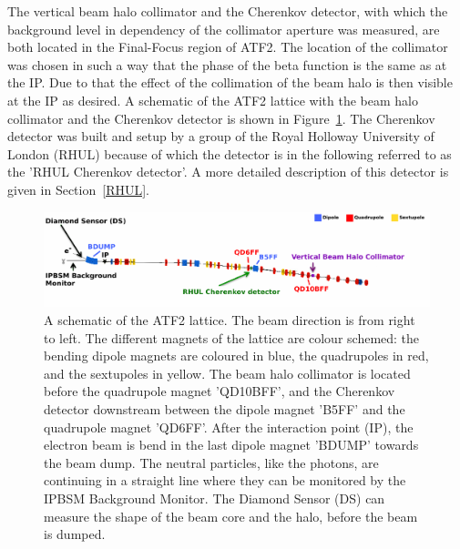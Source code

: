 The vertical beam halo collimator and the Cherenkov detector, with which the background level in dependency of the collimator aperture was measured, are both located in the Final-Focus region of ATF2. The location of the collimator was chosen in such a way that the phase of the beta function is the same as at the IP. Due to that the effect of the collimation of the beam halo is then visible at the IP as desired. A schematic of the ATF2 lattice with the beam halo collimator and the Cherenkov detector is shown in Figure~\ref{fig:ATF2}. The Cherenkov detector was built and setup by a group of the Royal Holloway University of London (RHUL) because of which the detector is in the following referred to as the 'RHUL Cherenkov detector'. A more detailed description of this detector is given in Section~\ref{RHUL}.

\begin{figure}
\centering
\includegraphics[width=\textwidth]{Figures/ATF2schematic.pdf}
\caption[ATF2]{A schematic of the ATF2 lattice. The beam direction is from right to left. The different magnets of the lattice are colour schemed: the bending dipole magnets are coloured in blue, the quadrupoles in red, and the sextupoles in yellow. The beam halo collimator is located before the quadrupole magnet 'QD10BFF', and the Cherenkov detector downstream between the dipole magnet 'B5FF' and the quadrupole magnet 'QD6FF'. After the interaction point (IP), the electron beam is bend in the last dipole magnet 'BDUMP' towards the beam dump. The neutral particles, like the photons, are continuing in a straight line where they can be monitored by the IPBSM Background Monitor. The Diamond Sensor (DS) can measure the shape of the beam core and the halo, before the beam is dumped.}
\label{fig:ATF2}
\end{figure}

